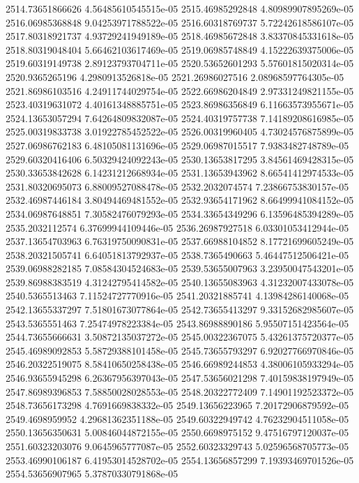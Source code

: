 {2514.73651866626 4.56485610545515e-05
2515.46985292848 4.80989907895269e-05
2516.06985368848 9.04253971788522e-05
2516.60318769737 5.72242618586107e-05
2517.80318921737 4.93729241949189e-05
2518.46985672848 3.83370845331618e-05
2518.80319048404 5.66462103617469e-05
2519.06985748849 4.15222639375006e-05
2519.60319149738 2.89123793704711e-05
2520.53652601293 5.57601815020314e-05
2520.9365265196 4.2980913526818e-05
2521.26986027516 2.08968597764305e-05
2521.86986103516 4.24911744029754e-05
2522.66986204849 2.97331249821155e-05
2523.40319631072 4.40161348885751e-05
2523.86986356849 6.11663573955671e-05
2524.13653057294 7.64264809832087e-05
2524.40319757738 7.14189208616985e-05
2525.00319833738 3.01922785452522e-05
2526.00319960405 4.73024576875899e-05
2527.06986762183 6.48105081131696e-05
2529.06987015517 7.9383482748789e-05
2529.60320416406 6.50329424092243e-05
2530.13653817295 3.84561469428315e-05
2530.33653842628 6.14231212668934e-05
2531.13653943962 8.66541412974533e-05
2531.80320695073 6.88009527088478e-05
2532.2032074574 7.23866753830157e-05
2532.46987446184 3.80494469481552e-05
2532.93654171962 8.66499941084152e-05
2534.06987648851 7.30582476079293e-05
2534.33654349296 6.13596485394289e-05
2535.2032112574 6.37699944109446e-05
2536.26987927518 6.03301053412944e-05
2537.13654703963 6.76319750090831e-05
2537.66988104852 8.17721699605249e-05
2538.20321505741 6.64051813792937e-05
2538.7365490663 5.46447512506421e-05
2539.06988282185 7.08584304524683e-05
2539.53655007963 3.23950047543201e-05
2539.86988383519 4.31242795414582e-05
2540.13655083963 4.31232007433078e-05
2540.5365513463 7.11524727770916e-05
2541.20321885741 4.13984286140068e-05
2542.13655337297 7.51801673077864e-05
2542.73655413297 9.33152682985607e-05
2543.5365551463 7.25474978223384e-05
2543.86988890186 5.95507151423564e-05
2544.73655666631 3.50872135037272e-05
2545.00322367075 5.43261375720377e-05
2545.46989092853 5.58729388101458e-05
2545.73655793297 6.92027766970846e-05
2546.20322519075 8.58410650258438e-05
2546.66989244853 4.38006105933294e-05
2546.93655945298 6.26367956397043e-05
2547.53656021298 7.40159838197949e-05
2547.86989396853 7.58850028028553e-05
2548.20322772409 7.14901192523372e-05
2548.73656173298 4.7691669838332e-05
2549.13656223965 7.20172906879592e-05
2549.4698959952 4.29681362351188e-05
2549.60322949742 4.76232904511058e-05
2550.13656350631 5.00846044872155e-05
2550.6698975152 9.47516797120037e-05
2551.60323203076 9.0645965777087e-05
2552.60323329743 5.02596568705773e-05
2553.46990106187 6.41953014528702e-05
2554.13656857299 7.19393469701526e-05
2554.53656907965 5.37870330791868e-05
}
